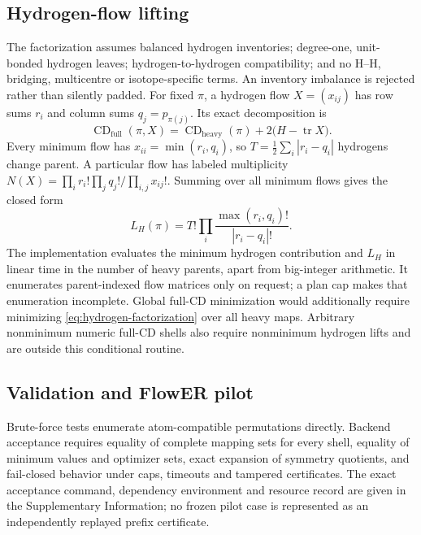 \documentclass[11pt]{article}
\newcommand{\CD}{\operatorname{CD}}
\begin{document}
\subsection*{Hydrogen-flow lifting}

The factorization assumes balanced hydrogen inventories; degree-one,
unit-bonded hydrogen leaves; hydrogen-to-hydrogen compatibility; and no
H--H, bridging, multicentre or isotope-specific terms.  An inventory imbalance
is rejected rather than silently padded.  For fixed $\pi$, a hydrogen flow
$X=(x_{ij})$ has row sums $r_i$ and column sums $q_j=p_{\pi(j)}$.  Its exact
decomposition is
\[
 \CD_{\mathrm{full}}(\pi,X)=\CD_{\mathrm{heavy}}(\pi)
   +2\bigl(H-\operatorname{tr}X\bigr).
\]
Every minimum flow has $x_{ii}=\min(r_i,q_i)$, so
$T=\tfrac12\sum_i|r_i-q_i|$ hydrogens change parent.  A particular flow has
labeled multiplicity
$N(X)=\prod_i r_i!\prod_jq_j!/\prod_{i,j}x_{ij}!$.  Summing over all minimum
flows gives the closed form
\begin{equation}
 L_H(\pi)=T!\prod_i
 \frac{\max(r_i,q_i)!}{|r_i-q_i|!}.
 \label{eq:hydrogen-multiplicity}
\end{equation}
The implementation evaluates the minimum hydrogen contribution and $L_H$ in
linear time in the number of heavy parents, apart from big-integer arithmetic.
It enumerates
parent-indexed flow matrices only on request; a plan cap makes that enumeration
incomplete.  Global full-CD minimization would additionally require minimizing
\cref{eq:hydrogen-factorization} over all heavy maps.  Arbitrary nonminimum
numeric full-CD shells also require nonminimum hydrogen lifts and are outside
this conditional routine.

\subsection*{Validation and FlowER pilot}

Brute-force tests enumerate atom-compatible permutations directly.  Backend
acceptance requires equality of complete mapping sets for every shell, equality
of minimum values and optimizer sets, exact expansion of symmetry quotients,
and fail-closed behavior under caps, timeouts and tampered certificates.  The
exact acceptance command, dependency environment and resource record are given
in the Supplementary Information; no frozen pilot case is represented as an
independently replayed prefix certificate.
\end{document}
